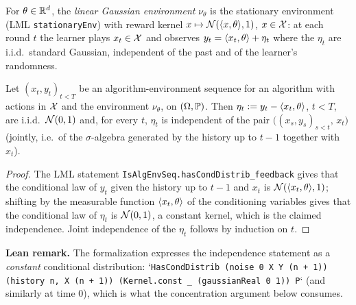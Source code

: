 \begin{definition}\label{def:env}
\leanok
{}
For $\theta \in \mathbb{R}^d$, the \emph{linear Gaussian environment} $\nu_\theta$ is the stationary
environment (LML \texttt{stationaryEnv}) with reward kernel
$x \mapsto \mathcal{N}(\langle x, \theta \rangle, 1)$, $x \in \mathcal{X}$: at each round $t$ the learner plays
$x_t \in \mathcal{X}$ and observes $y_t = \langle x_t, \theta \rangle + \eta_t$ where the $\eta_t$ are i.i.d.\
standard Gaussian, independent of the past and of the learner's randomness.
\end{definition}

\begin{lemma}[Noise representation]\label{lem:noise_representation}
\leanok
\uses{def:env}
Let $(x_t, y_t)_{t < T}$ be an algorithm-environment sequence for an algorithm with actions
in $\mathcal{X}$ and the environment $\nu_\theta$, on $(\Omega, \mathbb{P})$. Then
$\eta_t := y_t - \langle x_t, \theta \rangle$, $t < T$, are i.i.d.\ $\mathcal{N}(0,1)$ and, for every $t$,
$\eta_t$ is independent of the pair $\big((x_s, y_s)_{s < t},\, x_t\big)$ (jointly, i.e.\ of the
$\sigma$-algebra generated by the history up to $t-1$ together with $x_t$).
\end{lemma}

\begin{proof}
\leanok
{}
The LML statement \texttt{IsAlgEnvSeq.hasCondDistrib\_feedback} gives that the conditional law
of $y_t$ given the history up to $t-1$ and $x_t$ is $\mathcal{N}(\langle x_t, \theta \rangle,1)$; shifting by
the measurable function $\langle x_t, \theta \rangle$ of the conditioning variables gives that the
conditional law of $\eta_t$ is $\mathcal{N}(0,1)$, a constant kernel, which is the claimed
independence. Joint independence of the $\eta_t$ follows by induction on $t$.
\end{proof}

\textbf{Lean remark.} The formalization expresses the independence statement as a
\emph{constant} conditional distribution: `\texttt{HasCondDistrib (noise θ X Y (n + 1))
(history n, X (n + 1)) (Kernel.const \_ (gaussianReal 0 1)) P}` (and similarly at time $0$),
which is what the concentration argument below consumes.

